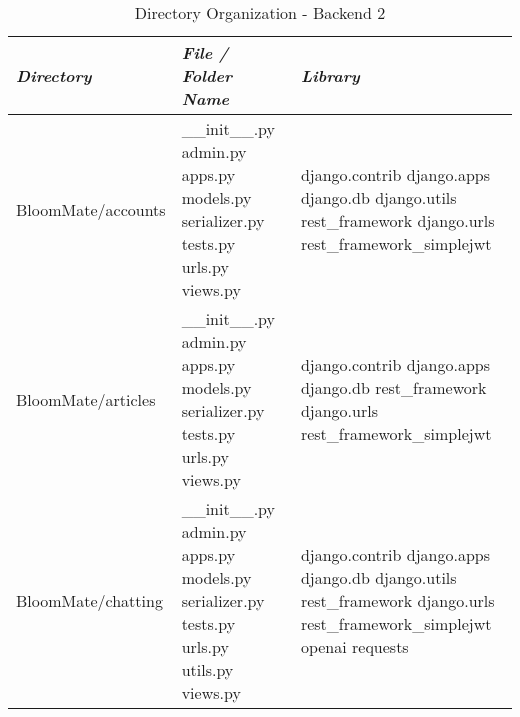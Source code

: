 \documentclass[conference, a4paper]{IEEEtran}
\begin{document}
\begin{table} [htp]
    \caption{Directory Organization - Backend 2}
    \centering
    \renewcommand{\arraystretch}{1.3}
    \begin{tabular}{p{1.7cm}|p{2.8cm}|p{2.5cm}}
    \hline
    \textit{\textbf{Directory}} & \textit{\textbf{File / Folder Name}} & \textit{\textbf{Library}} \\
     \hline
      BloomMate\newline/accounts & \_\_init\_\_.py \newline admin.py \newline apps.py \newline models.py \newline serializer.py \newline tests.py \newline urls.py \newline views.py & django.contrib \newline django.apps \newline django.db \newline django.utils \newline rest\_framework \newline django.urls \newline rest\_framework\_simplejwt \\
\hline
 BloomMate\newline/articles & \_\_init\_\_.py \newline admin.py \newline apps.py \newline models.py \newline serializer.py \newline tests.py \newline urls.py \newline views.py & django.contrib  \newline 
django.apps \newline django.db \newline rest\_framework \newline django.urls \newline rest\_framework\_simplejwt \\
 \hline
 BloomMate\newline /chatting & \_\_init\_\_.py \newline admin.py \newline apps.py \newline models.py \newline serializer.py \newline tests.py \newline urls.py \newline utils.py \newline views.py &  django.contrib \newline django.apps \newline django.db \newline django.utils \newline rest\_framework \newline django.urls \newline rest\_framework\_simplejwt \newline openai \newline requests

\end{tabular}
\end{table}
\end{document}
